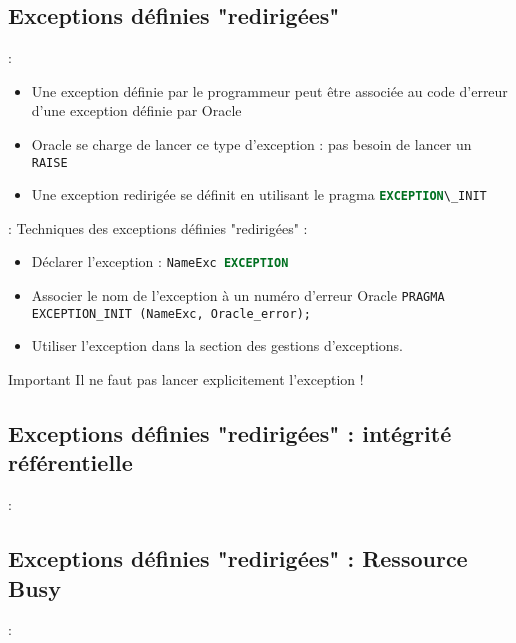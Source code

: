 \documentclass[10pt]{beamer}
\begin{document}
\subsection{Exceptions définies "redirigées"}
\begin{frame}{\secname : \subsecname}
    \begin{itemize}
        \item Une exception définie par le programmeur peut être associée au code d'erreur d'une exception définie par Oracle
        \item Oracle se charge de lancer ce type d'exception : pas besoin de lancer un \lstinline[language=sql]!RAISE!
        \item Une exception redirigée se définit en utilisant le pragma \lstinline[language=sql]!EXCEPTION\_INIT!
    \end{itemize}
\end{frame}

\begin{frame}{\secname : \subsecname}
    Techniques des exceptions définies "redirigées" :
    \begin{itemize}
        \item Déclarer l'exception : \lstinline[language=sql]!NameExc EXCEPTION!
        \item Associer le nom de l'exception à un numéro d'erreur Oracle \lstinline[language=sql]!PRAGMA EXCEPTION_INIT (NameExc, Oracle_error);!
        \item Utiliser l'exception dans la section des gestions d'exceptions.
    \end{itemize}
    \begin{alertblock}{Important}
        Il ne faut pas lancer explicitement l'exception !
    \end{alertblock}
\end{frame}

\subsection{Exceptions définies "redirigées" : intégrité référentielle}
\begin{frame}{\secname : \subsecname}
    
\end{frame}

\subsection{Exceptions définies "redirigées" : Ressource Busy}
\begin{frame}{\secname : \subsecname}
    
\end{frame}
\end{document}
